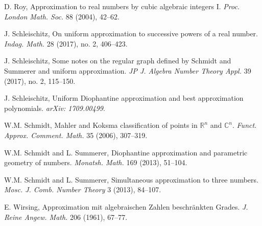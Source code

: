 \documentclass[12pt]{amsart}
\theoremstyle{definition}
\begin{document}
\begin{thebibliography}{99}
 D. Roy, Approximation to real numbers by cubic algebraic integers I. 
{\em Proc. London Math. Soc.} 88 (2004), 42--62.
  

 J. Schleischitz, On uniform approximation to successive powers
of a real number. {\em Indag. Math.} 28 (2017), no. 2, 406--423.

 J. Schleischitz, Some notes on the regular graph
defined by Schmidt and Summerer and uniform
approximation. {\em JP J. Algebra Number Theory Appl.}
39 (2017), no. 2, 115--150.


 J. Schleischitz, Uniform Diophantine approximation
and best approximation polynomials. {\em arXiv: 1709.00499}. 

 W.M. Schmidt, Mahler and Koksma classification of points in $\mathbb{R}^{n}$
and $\mathbb{C}^{n}$. {\em Funct. Approx. Comment. Math.} 35 (2006), 307--319.

 W.M. Schmidt and L. Summerer, 
Diophantine approximation and parametric geometry of numbers. 
{\em Monatsh. Math.} 169 (2013), 51--104. 

  W.M. Schmidt and L. Summerer, 
Simultaneous approximation to three numbers.
{\em Mosc. J. Comb. Number Theory} 3 (2013), 84--107.

 E. Wirsing, Approximation mit algebraischen Zahlen beschr\"ankten Grades.
{\em J. Reine Angew. Math.} 206 (1961), 67--77.


\end{thebibliography}
\end{document}

